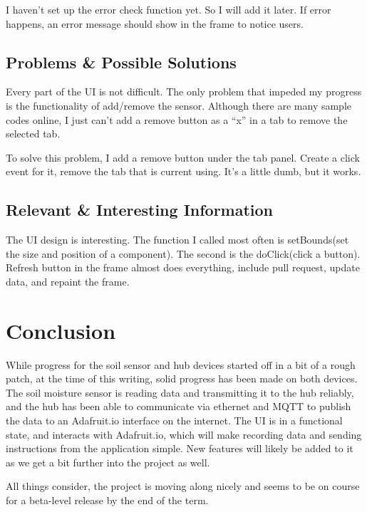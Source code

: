 \documentclass[onecolumn, draftclsnofoot,10pt, compsoc]{IEEEtran}
\begin{document}
    I haven’t set up the error check function yet. So I will add it later. If error happens, an error message should show in the frame to notice users.
    \subsection{Problems \& Possible Solutions}%
    Every part of the UI is not difficult. The only problem that impeded my progress is the functionality of add/remove the sensor. Although there are many sample codes online, I just can’t add a remove button as a “x” in a tab to remove the selected tab.
    
    To solve this problem, I add a remove button under the tab panel. Create a click event for it, remove the tab that is current using. It’s a little dumb, but it works.
    \subsection{Relevant \& Interesting Information}%
    The UI design is interesting. The function I called most often is setBounds(set the size and position of a component). The second is the doClick(click a button). Refresh button in the frame almost does everything, include pull request, update data, and repaint the frame.
    
    \section{Conclusion}
    While progress for the soil sensor and hub devices started off in a bit of a rough patch, at the time of this writing, solid progress has been made on both devices.
    The soil moisture sensor is reading data and transmitting it to the hub reliably, and the hub has been able to communicate via ethernet and MQTT to publish the data to an Adafruit.io interface on the internet.
    The UI is in a functional state, and interacts with Adafruit.io, which will make recording data and sending instructions from the application simple.
    New features will likely be added to it as we get a bit further into the project as well.
   
   All things consider, the project is moving along nicely and seems to be on course for a beta-level release by the end of the term.
    
    
    \pagebreak
    
\end{document}
